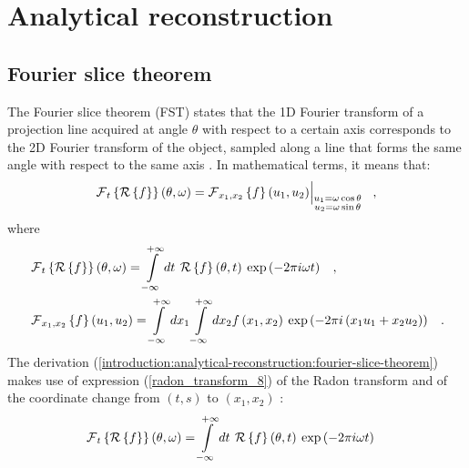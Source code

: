 {\section{Analytical reconstruction}
\subsection{Fourier slice theorem}
\label{subsection:fourier-slice-theorem}
The Fourier slice theorem (FST) states that
the 1D Fourier transform of a projection line acquired at angle $\theta$ with respect to a certain axis corresponds to the 2D Fourier transform 
of the object, sampled along a line that forms the same angle with respect to the same axis \cite{Kak2001}.
In mathematical terms, it means that:
\begin{equation}
  \operatorname{\mathcal{F}}_{t}\left\{\operatorname{\mathcal{R}}\left\{ f \right\}\right\}(\theta,\omega) = 
  \operatorname{\mathcal{F}}_{x_{1},x_{2}}\left\{ f \right\}\left(u_{1},u_{2}\right)
  \Bigr\rvert_{\substack{u_{1} = \omega\cos\theta\\u_{2} = \omega\sin\theta}}\hspace{0.3cm},
  \label{introduction:analytical-reconstruction:fourier-slice-theorem}
\end{equation}
where
\begin{equation}
\begin{split}
    & \operatorname{\mathcal{F}}_{t}\left\{\operatorname{\mathcal{R}}\left\{ f \right\}\right\}(\theta,\omega) =
	\int\limits_{-\infty}^{+\infty}dt\:\operatorname{\mathcal{R}}\left\{ f \right\}(\theta,t)\:\exp\left(-2\pi i\omega t\right) \hspace{0.3cm},\\
    & \operatorname{\mathcal{F}}_{x_{1},x_{2}}\left\{ f \right\}\left(u_{1},u_{2}\right) =
	\int\limits_{-\infty}^{+\infty}dx_{1} \int\limits_{-\infty}^{+\infty}dx_{2} f\left(x_{1},x_{2}\right) 
	    \:\exp\left(-2\pi i\left(x_{1}u_{1} + x_{2}u_{2}\right)\right)\hspace{0.3cm}.
\end{split}
\end{equation}
The derivation (\ref{introduction:analytical-reconstruction:fourier-slice-theorem}) makes use of expression (\ref{radon_transform_8})
of the Radon transform and of the coordinate change from $(t,s)$ to $(x_{1},x_{2})$ \cite{Kak2001}:
\begin{equation}
    \begin{split}
    \Four_{t}\left\{\Radon\left\{ f \right\}\right\}(\theta,\omega) &= 
             \int\limits_{-\infty}^{+\infty}dt\:\Radon\left\{ f \right\}(\theta,t)\:\exp\left(-2\pi i\omega t\right)                        

\end{split}
\end{equation}}
